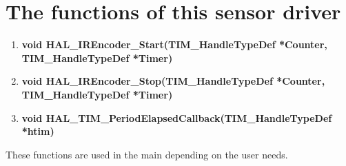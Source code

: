 \section{The functions of this sensor driver}
\begin{enumerate}
    \item \textbf{void HAL\_IREncoder\_Start(TIM\_HandleTypeDef *Counter,\\TIM\_HandleTypeDef *Timer)}
    \item \textbf{void HAL\_IREncoder\_Stop(TIM\_HandleTypeDef *Counter, \\TIM\_HandleTypeDef *Timer)}
    \item \textbf{void HAL\_TIM\_PeriodElapsedCallback(TIM\_HandleTypeDef *htim)}
\end{enumerate}
These functions are used in the main depending on the user needs.
\clearpage
